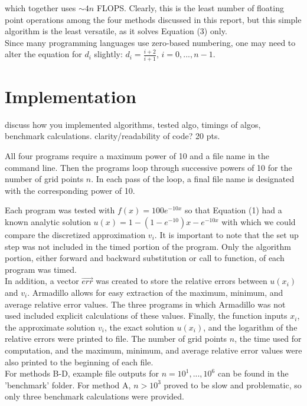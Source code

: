 \documentclass[prb,aps,twocolumn,showpacs,10pt]{revtex4-1}
\begin{document}
\noindent which together uses $\sim 4 n$ FLOPS. Clearly, this is the least number of floating point operations among the four methods discussed in this report, but this simple algorithm is the least versatile, as it solves Equation (3) only. \\

Since many programming languages use zero-based numbering, one may need to alter the equation for $d_i$ slightly: $d_i = \frac{i+2}{i+1}$, $i=0,...,n-1$. 

\section{Implementation}

discuss how you implemented algorithms, tested algo, timings of algos, benchmark calculations. clarity/readability of code? 20 pts.

All four programs require a maximum power of 10 and a file name in the command line. Then the programs loop through successive powers of 10 for the number of grid points $n$. In each pass of the loop, a final file name is designated with the corresponding power of 10. 

Each program was tested with $f(x)=100e^{-10x}$ so that Equation (1) had a known analytic solution $u(x)= 1-(1-e^{-10})x-e^{-10x}$ with which we could compare the discretized approximation $v_i$. It is important to note that the set up step was not included in the timed portion of the program. Only the algorithm portion, either forward and backward substitution or call to function, of each program was timed.\\

In addition, a vector $\vec{err}$ was created to store the relative errors between $u(x_i)$ and $v_i$. Armadillo allows for easy extraction of the maximum, minimum, and average relative error values. The three programs in which Armadillo was not used included explicit calculations of these values. Finally, the function inputs $x_i$, the approximate solution $v_i$, the exact solution $u(x_i)$, and the logarithm of the relative errors were printed to file. The number of grid points $n$, the time used for computation, and the maximum, minimum, and average relative error values were also printed to the beginning of each file.\\

For methods B-D, example file outputs for $n=10^1,...,10^6$ can be found in the 'benchmark' folder. For method A, $n>10^3$ proved to be slow and problematic, so only three benchmark calculations were provided. 
\end{document}
